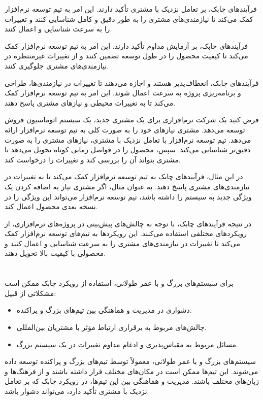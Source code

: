 فرآیندهای چابک، بر تعامل نزدیک با مشتری تأکید دارند. این امر به تیم توسعه نرم‌افزار کمک می‌کند تا نیازمندی‌های مشتری را به طور دقیق و کامل شناسایی کنند و تغییرات را به سرعت شناسایی و اعمال کنند.

فرآیندهای چابک، بر آزمایش مداوم تأکید دارند. این امر به تیم توسعه نرم‌افزار کمک می‌کند تا کیفیت محصول را در طول توسعه تضمین کنند و از تغییرات غیرمنتظره در نیازمندی‌های مشتری جلوگیری کنند.

فرآیندهای چابک، انعطاف‌پذیر هستند و اجازه می‌دهند تا تغییرات در نیازمندی‌ها، طراحی و برنامه‌ریزی پروژه به سرعت اعمال شوند. این امر به تیم توسعه نرم‌افزار کمک می‌کند تا به تغییرات محیطی و نیازهای مشتری پاسخ دهند.

فرض کنید یک شرکت نرم‌افزاری برای یک مشتری جدید، یک سیستم اتوماسیون فروش توسعه می‌دهد. مشتری نیازهای خود را به صورت کلی به تیم توسعه نرم‌افزار ارائه می‌دهد. تیم توسعه نرم‌افزار با تعامل نزدیک با مشتری، نیازهای مشتری را به صورت دقیق‌تر شناسایی می‌کند. سپس، محصول را در فواصل زمانی کوتاه تحویل می‌دهد تا مشتری بتواند آن را بررسی کند و تغییرات را درخواست کند.

در این مثال، فرآیندهای چابک به تیم توسعه نرم‌افزار کمک می‌کند تا به تغییرات در نیازمندی‌های مشتری پاسخ دهند. به عنوان مثال، اگر مشتری نیاز به اضافه کردن یک ویژگی جدید به سیستم را داشته باشد، تیم توسعه نرم‌افزار می‌تواند این ویژگی را در نسخه بعدی محصول اعمال کند.

در نتیجه فرآیندهای چابک، با توجه به چالش‌های پیش‌بینی در پروژه‌های نرم‌افزاری، از رویکردهای مختلفی استفاده می‌کنند. این رویکردها به تیم‌های توسعه نرم‌افزار کمک می‌کند تا تغییرات در نیازمندی‌های مشتری را به سرعت شناسایی و اعمال کنند و محصولی با کیفیت بالا تحویل دهند.

\section*{}
برای سیستم‌های بزرگ و با عمر طولانی، استفاده از رویکرد چابک ممکن است مشکلاتی از قبیل:
\begin{itemize}
	\item دشواری در مدیریت و هماهنگی بین تیم‌های بزرگ و پراکنده.
	\item چالش‌های مربوط به برقراری ارتباط مؤثر با مشتریان بین‌المللی.
	\item مسائل مربوط به مقیاس‌پذیری و ادغام مداوم تغییرات در یک سیستم بزرگ.
\end{itemize}

سیستم‌های بزرگ و با عمر طولانی، معمولاً توسط تیم‌های بزرگ و پراکنده توسعه داده می‌شوند. این تیم‌ها ممکن است در مکان‌های مختلف قرار داشته باشند و از فرهنگ‌ها و زبان‌های مختلف باشند. مدیریت و هماهنگی بین این تیم‌ها، در رویکرد چابک که بر تعامل نزدیک با مشتری تأکید دارد، می‌تواند دشوار باشد.

